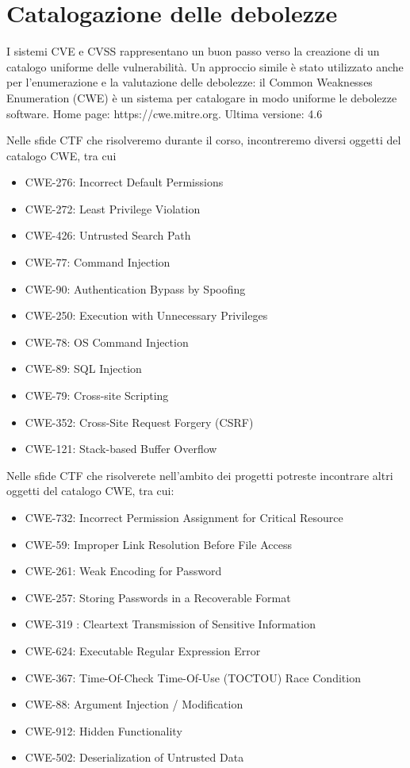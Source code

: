 \chapter{Catalogazione delle debolezze}
I sistemi CVE e CVSS rappresentano un buon passo
verso la creazione di un catalogo uniforme delle
vulnerabilità. Un approccio simile è stato utilizzato anche per
l’enumerazione e la valutazione delle debolezze: il Common Weaknesses Enumeration (CWE) è un
sistema per catalogare in modo uniforme le
debolezze software. Home page: https://cwe.mitre.org. Ultima versione: 4.6 

Nelle sfide CTF che risolveremo durante il corso,
incontreremo diversi oggetti del catalogo CWE, tra cui
\begin{itemize}
    \item CWE-276: Incorrect Default Permissions
    \item CWE-272: Least Privilege Violation
    \item CWE-426: Untrusted Search Path
    \item CWE-77: Command Injection
    \item CWE-90: Authentication Bypass by Spoofing
    \item CWE-250: Execution with Unnecessary Privileges
    \item CWE-78: OS Command Injection
    \item CWE-89: SQL Injection
    \item CWE-79: Cross-site Scripting
    \item CWE-352: Cross-Site Request Forgery (CSRF)
    \item CWE-121: Stack-based Buffer Overflow 
\end{itemize}
Nelle sfide CTF che risolverete nell’ambito dei
progetti potreste incontrare altri oggetti del catalogo
CWE, tra cui:
\begin{itemize}
    \item CWE-732: Incorrect Permission Assignment for Critical
Resource
    \item CWE-59: Improper Link Resolution Before File Access
    \item CWE-261: Weak Encoding for Password
    \item CWE-257: Storing Passwords in a Recoverable Format
    \item CWE-319 : Cleartext Transmission of Sensitive Information
    \item CWE-624: Executable Regular Expression Error
    \item CWE-367: Time-Of-Check Time-Of-Use (TOCTOU) Race
Condition
    \item CWE-88: Argument Injection / Modification
    \item CWE-912: Hidden Functionality
    \item CWE-502: Deserialization of Untrusted Data
\end{itemize}

